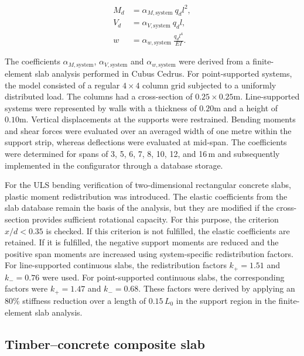\begin{equation}
\begin{aligned}
M_d &= \alpha_{M,\mathrm{system}} \ q_d l^2,\\
V_d &= \alpha_{V,\mathrm{system}} \ q_d l,\\
w &= \alpha_{w,\mathrm{system}}\ \frac{q_d l^4}{EI}.
\end{aligned}
\end{equation}

The coefficients $\alpha_{M,\mathrm{system}}$, $\alpha_{V,\mathrm{system}}$ and $\alpha_{w,\mathrm{system}}$ were derived from a finite-element slab analysis performed in Cubus Cedrus. For point-supported systems, the model consisted of a regular $4 \times 4$ column grid subjected to a uniformly distributed load. The columns had a cross-section of $0.25 \times 0.25 \mathrm{m}$. Line-supported systems were represented by walls with a thickness of $0.20\mathrm{m}$ and a height of $0.10\mathrm{m}$. Vertical displacements at the supports were restrained. Bending moments and shear forces were evaluated over an averaged width of one metre within the support strip, whereas deflections were evaluated at mid-span. The coefficients were determined for spans of 3, 5, 6, 7, 8, 10, 12, and 16\,m and subsequently implemented in the configurator through a database storage. 

For the ULS bending verification of two-dimensional rectangular concrete slabs, plastic moment redistribution was introduced. The elastic coefficients from the slab database remain the basis of the analysis, but they are modified if the cross-section provides sufficient rotational capacity. For this purpose, the criterion \(x/d < 0.35\) is checked. If this criterion is not fulfilled, the elastic coefficients are retained. If it is fulfilled, the negative support moments are reduced and the positive span moments are increased using system-specific redistribution factors. For line-supported continuous slabs, the redistribution factors \(k_{+}=1.51\) and \(k_{-}=0.76\) were used. For point-supported continuous slabs, the corresponding factors were \(k_{+}=1.47\) and \(k_{-}=0.68\). These factors were derived by applying an 80\% stiffness reduction over a length of \(0.15\,L_0\) in the support region in the finite-element slab analysis.


\subsection{Timber--concrete composite slab}

